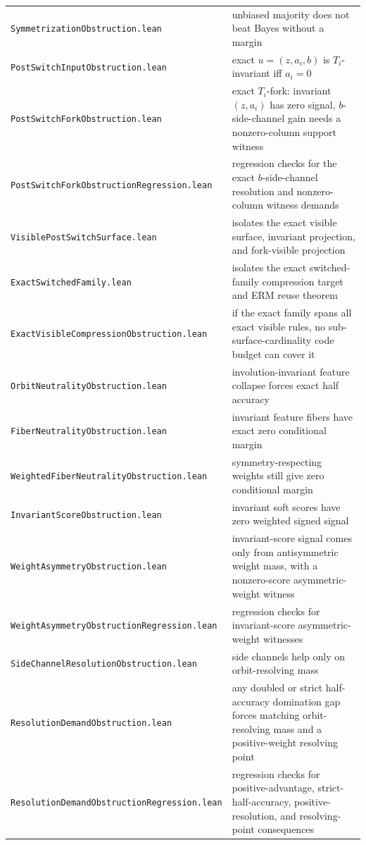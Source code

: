 \documentclass[11pt]{article}
\theoremstyle{remark}
\begin{document}
\begin{center}
\begin{tabular}{ll}
\texttt{SymmetrizationObstruction.lean} & unbiased majority does not beat Bayes without a margin \\
\texttt{PostSwitchInputObstruction.lean} & exact \(u=(z,a_i,b)\) is \(T_i\)-invariant iff \(a_i=0\) \\
\texttt{PostSwitchForkObstruction.lean} & exact \(T_i\)-fork: invariant \((z,a_i)\) has zero signal, \(b\)-side-channel gain needs a nonzero-column support witness \\
\texttt{PostSwitchForkObstructionRegression.lean} & regression checks for the exact \(b\)-side-channel resolution and nonzero-column witness demands \\
\texttt{VisiblePostSwitchSurface.lean} & isolates the exact visible surface, invariant projection, and fork-visible projection \\
\texttt{ExactSwitchedFamily.lean} & isolates the exact switched-family compression target and ERM reuse theorem \\
\texttt{ExactVisibleCompressionObstruction.lean} & if the exact family spans all exact visible rules, no sub-surface-cardinality code budget can cover it \\
\texttt{OrbitNeutralityObstruction.lean} & involution-invariant feature collapse forces exact half accuracy \\
\texttt{FiberNeutralityObstruction.lean} & invariant feature fibers have exact zero conditional margin \\
\texttt{WeightedFiberNeutralityObstruction.lean} & symmetry-respecting weights still give zero conditional margin \\
\texttt{InvariantScoreObstruction.lean} & invariant soft scores have zero weighted signed signal \\
\texttt{WeightAsymmetryObstruction.lean} & invariant-score signal comes only from antisymmetric weight mass, with a nonzero-score asymmetric-weight witness \\
\texttt{WeightAsymmetryObstructionRegression.lean} & regression checks for invariant-score asymmetric-weight witnesses \\
\texttt{SideChannelResolutionObstruction.lean} & side channels help only on orbit-resolving mass \\
\texttt{ResolutionDemandObstruction.lean} & any doubled or strict half-accuracy domination gap forces matching orbit-resolving mass and a positive-weight resolving point \\
\texttt{ResolutionDemandObstructionRegression.lean} & regression checks for positive-advantage, strict-half-accuracy, positive-resolution, and resolving-point consequences \\

\end{tabular}
\end{center}
\end{document}
